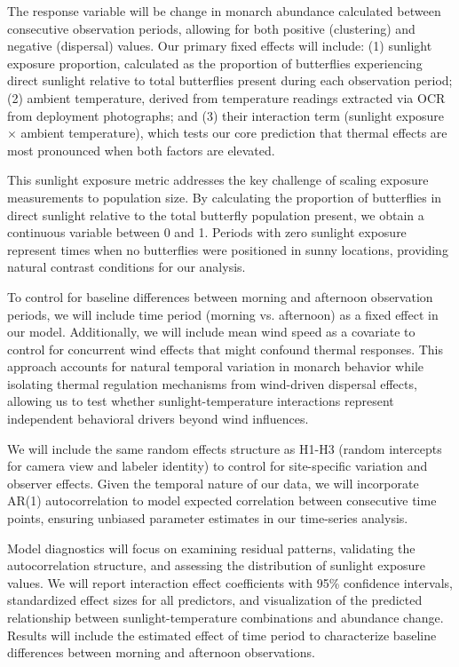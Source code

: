 The response variable will be change in monarch abundance calculated between consecutive observation periods, allowing for both positive (clustering) and negative (dispersal) values. Our primary fixed effects will include: (1) sunlight exposure proportion, calculated as the proportion of butterflies experiencing direct sunlight relative to total butterflies present during each observation period; (2) ambient temperature, derived from temperature readings extracted via OCR from deployment photographs; and (3) their interaction term (sunlight exposure $\times$ ambient temperature), which tests our core prediction that thermal effects are most pronounced when both factors are elevated.

This sunlight exposure metric addresses the key challenge of scaling exposure measurements to population size. By calculating the proportion of butterflies in direct sunlight relative to the total butterfly population present, we obtain a continuous variable between 0 and 1. Periods with zero sunlight exposure represent times when no butterflies were positioned in sunny locations, providing natural contrast conditions for our analysis.

To control for baseline differences between morning and afternoon observation periods, we will include time period (morning vs. afternoon) as a fixed effect in our model. Additionally, we will include mean wind speed as a covariate to control for concurrent wind effects that might confound thermal responses. This approach accounts for natural temporal variation in monarch behavior while isolating thermal regulation mechanisms from wind-driven dispersal effects, allowing us to test whether sunlight-temperature interactions represent independent behavioral drivers beyond wind influences.

We will include the same random effects structure as H1-H3 (random intercepts for camera view and labeler identity) to control for site-specific variation and observer effects. Given the temporal nature of our data, we will incorporate AR(1) autocorrelation to model expected correlation between consecutive time points, ensuring unbiased parameter estimates in our time-series analysis.

Model diagnostics will focus on examining residual patterns, validating the autocorrelation structure, and assessing the distribution of sunlight exposure values. We will report interaction effect coefficients with 95\% confidence intervals, standardized effect sizes for all predictors, and visualization of the predicted relationship between sunlight-temperature combinations and abundance change. Results will include the estimated effect of time period to characterize baseline differences between morning and afternoon observations.

